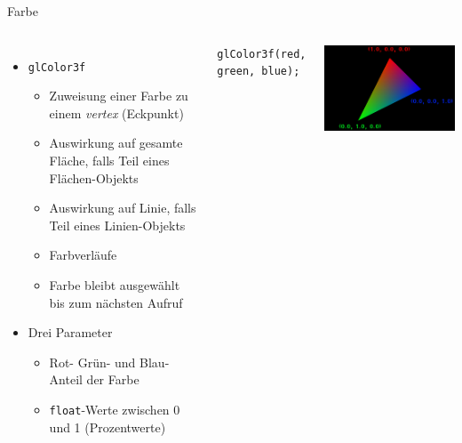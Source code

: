 
\begin{frame}[fragile]{Farbe}
%
\begin{columns}[T]
\begin{itemize}
\item \texttt{glColor3f}
	\begin{itemize}
	\item Zuweisung einer Farbe zu einem \emph{vertex} (Eckpunkt)
	\item Auswirkung auf gesamte Fläche, falls Teil eines Flächen-Objekts
	\item Auswirkung auf Linie, falls  Teil eines Linien-Objekts
	\item Farbverläufe
	\item Farbe bleibt ausgewählt bis zum nächsten Aufruf
	\end{itemize}
\item Drei Parameter
	\begin{itemize}
	\item Rot- Grün- und Blau-Anteil der Farbe
	\item \texttt{float}-Werte zwischen 0 und 1 (Prozentwerte)
	\end{itemize}
\end{itemize}
%
\vspace{-6pt}
\begin{codebox}
\begin{verbatim}
glColor3f(red, green, blue);
\end{verbatim}
\end{codebox}
\includegraphics[width=\linewidth]{./gfx/GL-Tricolor}
\end{columns}
%
\end{frame}

